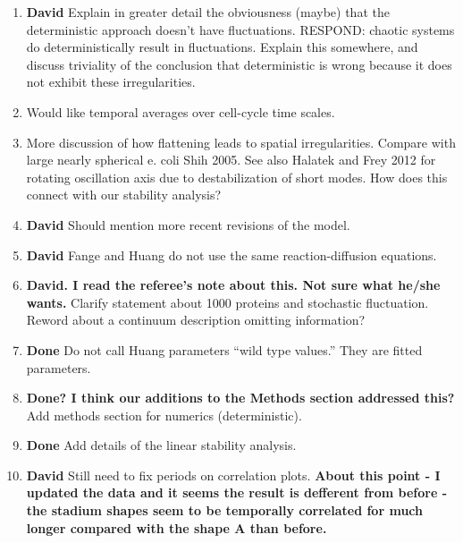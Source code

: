 \documentclass[10pt,letterpaper]{article}
\newcommand{\blue}[1]{{\bf \color{blue} #1}}
\begin{document}
{\begin{enumerate}
    stochastic model.  (Read carefully)
  \item \blue{David} Explain in greater detail the obviousness (maybe) that the
    deterministic approach doesn't have fluctuations.  RESPOND:
    chaotic systems do deterministically result in fluctuations.
    Explain this somewhere, and discuss triviality of the conclusion
    that deterministic is wrong because it does not exhibit these
    irregularities.
  \item Would like temporal averages over cell-cycle time scales.
  \item More discussion of how flattening leads to spatial
    irregularities.  Compare with large nearly spherical e. coli Shih
    2005.  See also Halatek and Frey 2012 for rotating oscillation
    axis due to destabilization of short modes.  How does this connect
    with our stability analysis?
  \item \blue{David} Should mention more recent revisions of the model.
  \item \blue{David} Fange and Huang do not use the same reaction-diffusion
    equations.
  \item \blue{David.  I read the referee's note about this.  Not sure
    what he/she wants.}  Clarify statement about 1000 proteins and
    stochastic fluctuation.  Reword about a continuum description
    omitting information?
  \item \blue{Done} Do not call Huang parameters ``wild type values.''  They are
    fitted parameters.
  \item \blue{Done?  I think our additions to the Methods section
    addressed this?}  Add methods section for numerics
    (deterministic).
  \item \blue{Done} Add details of the linear stability analysis.
  \item \blue{David} Still need to fix periods on correlation plots.
    \blue{About this point - I updated the data and it seems the
      result is defferent from before - the stadium shapes seem to be
      temporally correlated for much longer compared with the shape A
      than before.}
  \end{enumerate}
}
\end{document}

